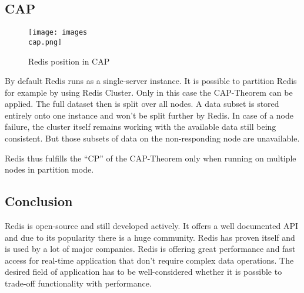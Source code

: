 \subsection{CAP}
\begin{figure}[h]
    \texttt{[image: images\\cap.png]}
    \caption{Redis position in CAP}
\end{figure}
By default Redis runs as a single-server instance. It is possible to partition
Redis for example by using Redis Cluster. Only in this case the CAP-Theorem can
be applied. The full dataset then is split over all nodes. A data subset is
stored entirely onto one instance and won’t be split further by Redis. In case
of a node failure, the cluster itself remains working with the available data
still being consistent. But those subsets of data on the non-responding node are
unavailable.

Redis thus fulfills the ``CP'' of the CAP-Theorem only when running on multiple
nodes in partition mode.

\subsection{Conclusion}
Redis is open-source and still developed actively. It offers a well documented
API and due to its popularity there is a huge community. Redis has proven itself
and is used by a lot of major companies. Redis is offering great performance and
fast access for real-time application that don’t require complex data
operations. The desired field of application has to be well-considered whether
it is possible to trade-off functionality with performance.
